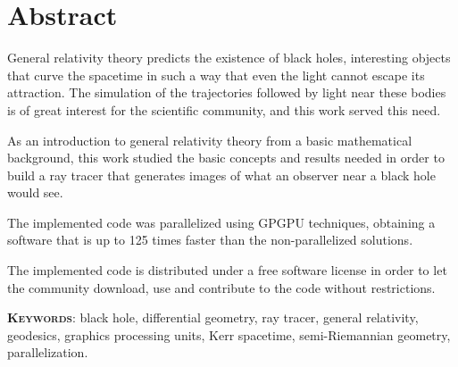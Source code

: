 \begingroup
\let\clearpage\relax
\let\cleardoublepage\relax
\let\cleardoublepage\relax

\chapter*{Abstract}
General relativity theory predicts the existence of black holes, interesting objects that curve the spacetime in such a way that even the light cannot escape its attraction. The simulation of the trajectories followed by light near these bodies is of great interest for the scientific community, and this work served this need.

As an introduction to general relativity theory from a basic mathematical background, this work studied the basic concepts and results needed in order to build a ray tracer that generates images of what an observer near a black hole would see.

The implemented code was parallelized using \ac{GPGPU} techniques, obtaining a software that is up to 125 times faster than the non-parallelized solutions.

The implemented code is distributed under a free software license in order to let the community download, use and contribute to the code without restrictions.

\vfill

\endgroup

\vfill

\textsc{\textbf{Keywords}}: black hole, differential geometry, ray tracer, general relativity, geodesics, graphics processing units, Kerr spacetime, semi-Riemannian geometry, parallelization.
